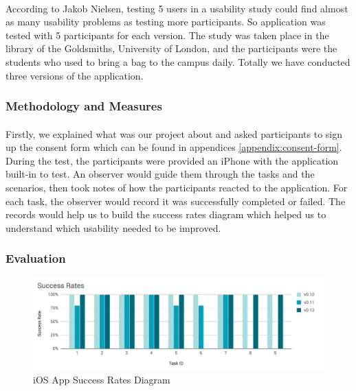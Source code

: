 \documentclass[12pt,a4paper]{article}
\begin{document}
          \paragraph{} According to Jakob Nielsen, testing 5 users in a usability study could find almost as many usability problems as testing more participants\cite{HowManyTestUsers}. So application was tested with 5 participants for each version. The study was taken place in the library of the Goldsmiths, University of London, and the participants were the students who used to bring a bag to the campus daily. Totally we have conducted three versions of the application.
          
        \subsubsection{Methodology and Measures}
          \paragraph{} Firstly, we explained what was our project about and asked participants to sign up the consent form which can be found in appendices \ref{appendix:consent-form}. During the test, the participants were provided an iPhone with the application built-in to test. An observer would guide them through the tasks and the scenarios, then took notes of how the participants reacted to the application. For each task, the observer would record it was successfully completed or failed. The records would help us to build the success rates diagram which helped us to understand which usability needed to be improved\cite{SuccessRates}. 
        
        \subsubsection{Evaluation}
          
          \begin{figure}[H]
            \centering
            \includegraphics[width=1\textwidth]{../assets/usability-test-success-rates.png}
            \caption{iOS App Success Rates Diagram}
            \label{fig:iOS App Success Rates Diagram}
          \end{figure}
\end{document}

